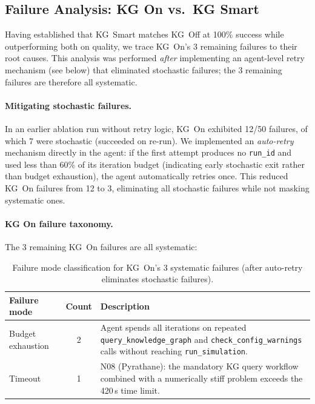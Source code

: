 \documentclass[twocolumn]{article}
\begin{document}
\subsection{Failure Analysis: KG On vs.\ KG Smart}
\label{sec:failure-analysis}

Having established that KG~Smart matches KG~Off at 100\% success while
outperforming both on quality, we trace KG~On's 3 remaining failures
to their root causes.  This analysis was performed \emph{after}
implementing an agent-level retry mechanism (see below) that
eliminated stochastic failures; the 3 remaining failures are therefore
all systematic.

\paragraph{Mitigating stochastic failures.}
In an earlier ablation run without retry logic, KG~On exhibited 12/50
failures, of which 7 were stochastic (succeeded on re-run).  We
implemented an \emph{auto-retry} mechanism directly in the agent:
if the first attempt produces no \texttt{run\_id} and used less than
60\% of its iteration budget (indicating early stochastic exit rather
than budget exhaustion), the agent automatically retries once.
This reduced KG~On failures from 12 to 3, eliminating all stochastic
failures while not masking systematic ones.

\paragraph{KG On failure taxonomy.}
The 3 remaining KG~On failures are all systematic:

\begin{table}[htbp]
\centering\footnotesize
\caption{Failure mode classification for KG~On's 3 systematic failures
  (after auto-retry eliminates stochastic failures).}
\label{tab:failure-modes}
\setlength{\tabcolsep}{4pt}
\begin{tabular}{lcp{5.2cm}}
\toprule
Failure mode & Count & Description \\
\midrule
Budget exhaustion  & 2 &
  Agent spends all iterations on repeated
  \texttt{query\_knowledge\_graph} and
  \texttt{check\_config\_warnings} calls without
  reaching \texttt{run\_simulation}. \\
\addlinespace
Timeout & 1 &
  N08 (Pyrathane): the mandatory KG query workflow
  combined with a numerically stiff problem exceeds the
  420\,s time limit. \\
\bottomrule
\end{tabular}
\end{table}
\end{document}
